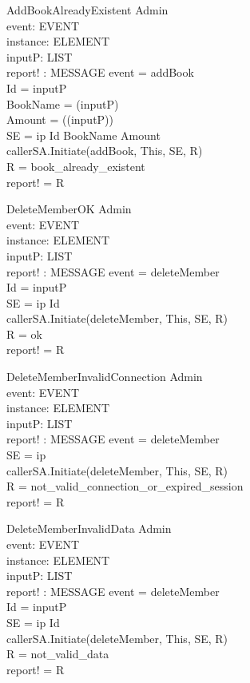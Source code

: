 \begin{schema}{AddBookAlreadyExistent}
\Xi Admin \\
event: EVENT \\
instance: ELEMENT \\
inputP: LIST \\
report! : MESSAGE 
\where event = addBook \\
Id = \head inputP \\
BookName = \head (\tail inputP) \\
Amount = \head (\tail (\tail inputP)) \\
SE = \lseq ip Id BookName Amount \rseq \\
callerSA.Initiate(addBook, This, SE, R) \\
R = book\_already\_existent \\ 
report! = R
\end{schema}

\begin{schema}{DeleteMemberOK}
\Xi Admin \\
event: EVENT \\
instance: ELEMENT \\
inputP: LIST \\
report! : MESSAGE 
\where event = deleteMember \\
Id = \head inputP \\
SE = \lseq ip Id \rseq \\
callerSA.Initiate(deleteMember, This, SE, R) \\
R = ok \\
report! = R 
\end{schema}

\begin{schema}{DeleteMemberInvalidConnection}
\Xi Admin \\
event: EVENT \\
instance: ELEMENT \\
inputP: LIST \\
report! : MESSAGE 
\where event = deleteMember \\
SE = \lseq ip \rseq \\
callerSA.Initiate(deleteMember, This, SE, R) \\
R = not\_valid\_connection\_or\_expired\_session \\ 
report! = R 
\end{schema}


\begin{schema}{DeleteMemberInvalidData}
\Xi Admin \\
event: EVENT \\
instance: ELEMENT \\
inputP: LIST \\
report! : MESSAGE 
\where event = deleteMember \\
Id = \head inputP \\
SE = \lseq ip Id \rseq \\
callerSA.Initiate(deleteMember, This, SE, R) \\
R = not\_valid\_data \\
report! = R
\end{schema}

